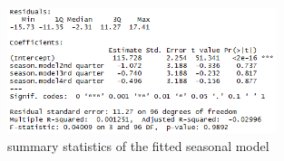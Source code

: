 \documentclass[11pt,a4paper]{article}
\begin{document}
\begin{figure}[!ht]
\centering
\includegraphics[angle=0,
width=0.7\textwidth]{summary_seasonmodel}
\caption{summary statistics of the fitted seasonal model\label{fig:summary_seasonmodel}}
\end{figure}


\end{document}
